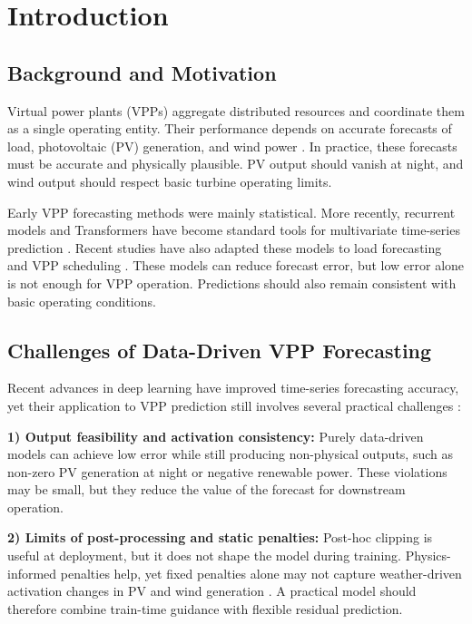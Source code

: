 \section{Introduction}

\subsection{Background and Motivation}
Virtual power plants (VPPs) aggregate distributed resources and coordinate them as a single operating entity. Their performance depends on accurate forecasts of load, photovoltaic (PV) generation, and wind power \cite{Ma2025,Cao2023,Qiu2024,Moreno2020,Wu2024}. In practice, these forecasts must be accurate and physically plausible. PV output should vanish at night, and wind output should respect basic turbine operating limits.

Early VPP forecasting methods were mainly statistical. More recently, recurrent models and Transformers have become standard tools for multivariate time-series prediction \cite{Zhou2021informer,Wu2021autoformer,Nie2023patchtst,Zeng2023}. Recent studies have also adapted these models to load forecasting and VPP scheduling \cite{Qiu2024,Ashraf2025,Du2025,Li2025MetaInformer}. These models can reduce forecast error, but low error alone is not enough for VPP operation. Predictions should also remain consistent with basic operating conditions.

\subsection{Challenges of Data-Driven VPP Forecasting}
Recent advances in deep learning have improved time-series forecasting accuracy, yet their application to VPP prediction still involves several practical challenges \cite{Vle2025,Arabzadeh2025}:

\textbf{1) Output feasibility and activation consistency:} Purely data-driven models can achieve low error while still producing non-physical outputs, such as non-zero PV generation at night or negative renewable power. These violations may be small, but they reduce the value of the forecast for downstream operation.

\textbf{2) Limits of post-processing and static penalties:} Post-hoc clipping is useful at deployment, but it does not shape the model during training. Physics-informed penalties help, yet fixed penalties alone may not capture weather-driven activation changes in PV and wind generation \cite{Raissi2019,Li2026,Asinyo2025}. A practical model should therefore combine train-time guidance with flexible residual prediction.

